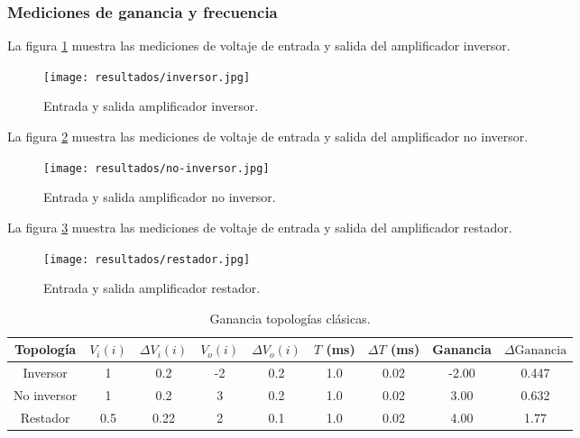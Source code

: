 \subsubsection{Mediciones de ganancia y frecuencia}

La figura \ref{fig:entrada-salida-inversor} muestra las mediciones de voltaje de entrada y salida del amplificador inversor.

\begin{figure}[ht]
    \centering
    \texttt{[image: resultados/inversor.jpg]}
    \caption{Entrada y salida amplificador inversor.}
    \label{fig:entrada-salida-inversor}
\end{figure}

La figura \ref{fig:entrada-salida-no-inversor} muestra las mediciones de voltaje de entrada y salida del amplificador no inversor.

\begin{figure}[ht]
    \centering
    \texttt{[image: resultados/no-inversor.jpg]}
    \caption{Entrada y salida amplificador no inversor.}
    \label{fig:entrada-salida-no-inversor}
\end{figure}

La figura \ref{fig:entrada-salida-restador} muestra las mediciones de voltaje de entrada y salida del amplificador restador.

\begin{figure}[ht]
    \centering
    \texttt{[image: resultados/restador.jpg]}
    \caption{Entrada y salida amplificador restador.}
    \label{fig:entrada-salida-restador}
\end{figure}



\begin{table}[h!]
\centering
\begin{tabular}{|c|c|c|c|c|c|c|c|c|}
\hline
Topología & \(V_i(i)\) & \(\Delta V_i(i)\) & \(V_o(i)\) & \(\Delta V_o(i)\) & \(T\) (ms) & \(\Delta T\) (ms) & Ganancia & \(\Delta \text{Ganancia}\) \\ \hline
Inversor & 1         & 0.2               & -2         & 0.2               & 1.0        & 0.02              & -2.00             & 0.447 \\ \hline
No inversor & 1         & 0.2               & 3          & 0.2               & 1.0        & 0.02              & 3.00              & 0.632 \\ \hline
Restador & 0.5       & 0.22              & 2          & 0.1               & 1.0        & 0.02              & 4.00              & 1.77 \\ \hline
\end{tabular}
\caption{Ganancia topologías clásicas.}
\label{tab:resultados-ganancia-frecuencia-topologias-basicas}
\end{table}

